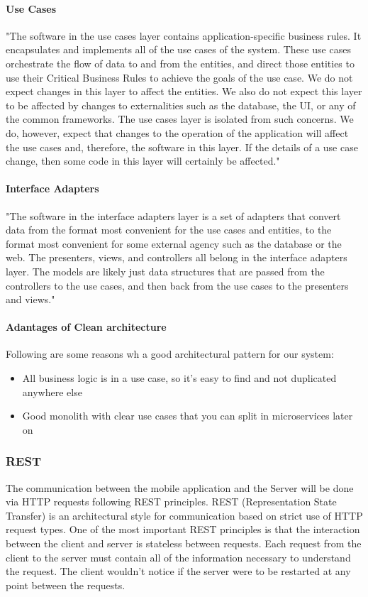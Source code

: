 \paragraph{Use Cases}
"The software in the use cases layer contains application-specific business rules. It encapsulates and implements all of the use cases of the system. These use cases orchestrate the flow of data to and from the entities, and direct those entities to use their Critical Business Rules to achieve the goals of the use case.
We do not expect changes in this layer to affect the entities. We also do not expect this layer to be affected by changes to externalities such as the database, the UI, or any of the common frameworks. The use cases layer is isolated from such concerns.
We do, however, expect that changes to the operation of the application will affect the use cases and, therefore, the software in this layer. If the details of a use case change, then some code in this layer will certainly be affected." \cite{clean}

\paragraph{Interface Adapters}
"The software in the interface adapters layer is a set of adapters that convert data from the format most convenient for the use cases and entities, to the format most convenient for some external agency such as the database or
the web. The presenters, views, and controllers all belong in the interface adapters layer. The models are likely just data structures that are passed from the controllers to the use cases, and then back from the use cases to the presenters and views." \cite{clean}

\paragraph{Adantages of Clean architecture}
Following are some reasons wh a good architectural pattern for our system:
\begin{itemize}
  \item All business logic is in a use case, so it’s easy to find and not duplicated anywhere else
  \item Good monolith with clear use cases that you can split in microservices later on

\end{itemize}


\subsubsection{REST}
The communication between the mobile application and the Server will be done via HTTP requests following REST principles. REST (Representation State Transfer) is an architectural style for communication based on strict use of HTTP request types. One of the most important REST principles is that the interaction between the client and server is stateless between requests. Each request from the client to the server must contain all of the information necessary to understand the request. The client wouldn’t notice if the server were to be restarted at any point between the requests.


